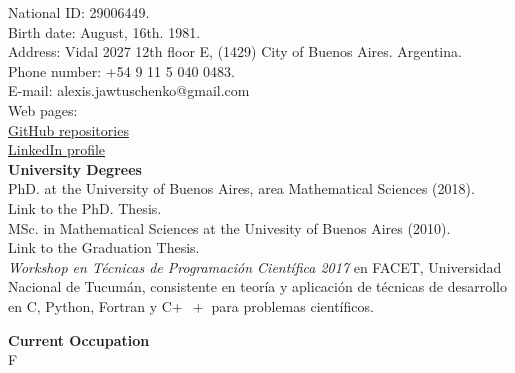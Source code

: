 \documentclass{res} %
\newcommand{\masmas}{\ensuremath{+\!\,\!\,\!\,+}}
\begin{document}
\begin{resume}
\bigskip
National ID: 29006449.\\
Birth date: August, 16th. 1981.\\
Address: Vidal 2027 12th floor E, (1429) City of Buenos Aires. Argentina.\\
Phone number: +54 9 11 5 040 0483.\\
E-mail: alexis.jawtuschenko@gmail.com\\
Web pages:\\
\href{https://github.com/alexisjawtu}{{\color{blue}GitHub repositories}}\\
\href{https://www.linkedin.com/in/alexis-jawtuschenko-486b4139/}{{\color{blue}LinkedIn profile}}
\\[5pt]

\textbf{University Degrees}\\[6pt]
PhD. at the University of Buenos Aires, area Mathematical Sciences (2018).\\
Link to the PhD. Thesis.\\[4pt]
MSc. in Mathematical Sciences at the Univesity of Buenos Aires (2010).\\
Link to the Graduation Thesis.\\[4pt]

\emph{Workshop en T\'ecnicas de Programaci\'on Cient\'ifica 2017} en FACET, 
Universidad Nacional de Tucum\'an, consistente en teor\'ia y aplicaci\'on de t\'ecnicas 
de desarrollo en C, Python, Fortran y C\masmas\,\,para problemas cient\'ificos.


\textbf{Current Occupation}\\[6pt]
  F 


\end{resume}
\end{document}
